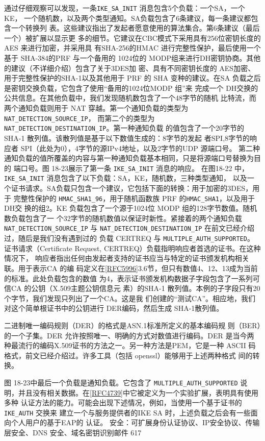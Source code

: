 通过仔细观察可以发现，一条\verb|IKE_SA_INIT| 消息包含5个负载：一个SA，一个KE，
一个随机数，以及两个类型通知。SA负载包含了6条建议，每一条建议都包含一个转换列
表。这些建议指出了发起者愿意使用的算法集合。第6条建议（最后一个）被扩展以显示更
多的细节。它建议在CBC模式下采用具有256位密钥长度的AES 来进行加密，并采用具
有SHA-256的HMAC 进行完整性保护，最后使用一个基于 SHA-384的PRF 与一个备用的
1024位的 MODP组来进行DH密钥协商。其他的建议（不详细介绍）包含了关于3DES加
密、具有不同密钥长度的 AES加密、用于完整性保护的SHA-1以及其他用于 PRF 的 SHA
变种的建议。在SA 负载之后是密钥交换负载，它包含了使用“备用的1024位MODP 组”来
完成一个 DH交换的公共信息。在其他负载中，我们发现随机数包含了一个48字节的随机
比特流，而两个通知负载则用于 NAT 穿越。第一个通知负载的类型为 \verb|NAT_DETECTION_SOURCE_IP|，
而第二个的类型为 \verb|NAT_DETECTION_DESTINATION_IP|。第一种通知负载
的值包含了一个20字节的SHA-1 散列值。该散列值是基于以下数值生成的：8字节的发起
者SPI,8字节的响应者 SPI（此处为0），4字节的源IPv4地址，以及2字节的UDP 源端口号。
第二种通知负载的值所覆盖的内容与第一种通知负载基本相同，只是将源端口号替换为目的
端口号。图 18-23展示了第一条 \verb|IKE_SA_INIT| 消息的响应。
在图18-22 中，\verb|IKE_SA_INIT| 消息包含了以下负载：SA，KE，随机数，三种类型通知，
以及一个证书请求。SA负载只包含一个建议，它包括下面的转换：用于加密的3DES，用于
完整性保护的 \verb|HMAC_SHA1_96|，用于随机函数族 PRF 的\verb|HMAC_SHA1|，以及用于DH交
换的组2。KE 负载包含了一个源于1024位 MODP 组的128字节数值。随机数负载包含了一
个32字节的随机数值以保证时新性。紧接着的两个通知负载 \verb|NAT_DETECTION_SOURCE_IP|
与 \verb|NAT_DETECTION_DESTINATION_IP| 在前文已经介绍过，随后是我们没有遇到过的
负载 CERTREQ 与 \verb|MULTIPLE_AUTH_SUPPORTED|。
证书请求（Certificate Request, CERTREQ）负载指明响应者首选的证书。在这种情况下，
响应者指出任何由发起者支持的证书应当与特定的证书颁发机构相关联。用于表示CA 的编
码定义在\href{https://www.rfc-editor.org/rfc/rfc5996}{[RFC5996]}3.6节，但只有数值4、12、13成为当前的标准。此处负载包含的数值
为4，表示证书颁发机构数据子字段包含了一系列可信CA 的公钥（X.509主题公钥信息元
素）的SHA-1 散列值。本例的子字段只有20个字节，我们发现只列出了一个CA。这是我
们创建的“测试CA”。相应地，我们对这个简单根证书中的公钥进行 DER编码，然后生成
SHA-1散列值。
\begin{tcolorbox}
    二进制唯一编码规则（DER）的格式是ASN.1标准所定义的基本编码规
    则（BER）的一个子集。DER 允许按照唯一、明确的方式对数值进行编码。DER
    是当今两种最流行的编码X.509证书的方法之一。另一种方法是PEM，它是一种
    ASCII 码格式，前文已经介绍过。许多工具（包括 openssl）能够用于上述两种格式
    间的转换。
\end{tcolorbox}
图 18-23中最后一个负载是通知负载。它包含了 \verb|MULTIPLE_AUTH_SUPPORTED|
说明，并且没有相关数据。在\href{https://www.rfc-editor.org/rfc/rfc4739}{[RFC4739]}中它被定义为一个实验扩展，表明具有使用多种
认证方法的能力。可能会出现下述情况，例如，当使用一个基于证书的\verb|IKE_AUTH| 交换来
建立一个与服务提供者的IKE SA 时，上述负载之后会有一些面向个人用户的基于EAP的
认证。
安全：可扩展身份认证协议、IP安全协议、传输层安全、DNS 安全、域名密钥识别邮件 617

